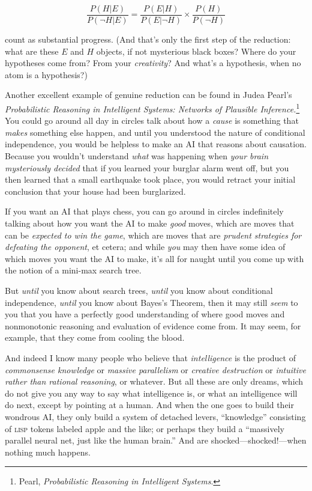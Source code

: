 \begin{equation*}
  \frac{P(H|E)}{P(\lnot H|E)} = \frac{P(E|H)}{P(E|\lnot H)} \times
  \frac{P(H)}{P(\lnot H)}
\end{equation*}


{
 count as substantial progress. (And that's only
the first step of the reduction: what are these $E$ and $H$ objects, if not
mysterious black boxes? Where do your hypotheses come from? From your
\textit{creativity}? And what's a hypothesis, when no
atom is a hypothesis?) }

{
 Another excellent example of genuine reduction can be found in
Judea Pearl's \textit{Probabilistic Reasoning in
Intelligent Systems: Networks of Plausible
Inference.}\footnote{Pearl, \textit{Probabilistic Reasoning in Intelligent
Systems}.} You could go around all day in circles
talk about how a \textit{cause} is something that \textit{makes}
something else happen, and until you understood the nature of
conditional independence, you would be helpless to make an AI that
reasons about causation. Because you wouldn't
understand \textit{what} was happening when \textit{your brain
mysteriously decided} that if you learned your burglar alarm went off,
but you then learned that a small earthquake took place, you would
retract your initial conclusion that your house had been burglarized.}

{
 If you want an AI that plays chess, you can go around in circles
indefinitely talking about how you want the AI to make \textit{good}
moves, which are moves that can be \textit{expected to win the game},
which are moves that are \textit{prudent strategies for defeating the
opponent}, et cetera; and while \textit{you} may then have some idea of
which moves you want the AI to make, it's all for
naught until you come up with the notion of a mini-max search tree.}

{
 But \textit{until} you know about search trees, \textit{until} you
know about conditional independence, \textit{until} you know about
Bayes's Theorem, then it may still \textit{seem} to you
that you have a perfectly good understanding of where good moves and
nonmonotonic reasoning and evaluation of evidence come from. It may
seem, for example, that they come from cooling the blood.}

{
 And indeed I know many people who believe that
\textit{intelligence} is the product of \textit{commonsense knowledge}
or \textit{massive parallelism} or \textit{creative destruction} or
\textit{intuitive rather than rational reasoning}, or whatever. But all
these are only dreams, which do not give you any way to say what
intelligence is, or what an intelligence will do next, except by
pointing at a human. And when the one goes to build their wondrous AI,
they only build a system of detached levers,
``knowledge'' consisting of \textsc{lisp}
tokens labeled apple and the like; or perhaps they build a
``massively parallel neural net, just like the human
brain.'' And are shocked---shocked!---when nothing
much happens.}


